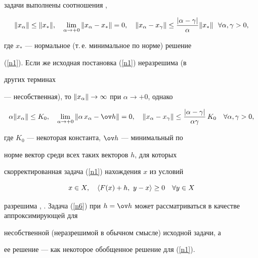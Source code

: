 задачи выполнены соотношения \cite{baku2}, \cite{baku3}


\begin{equation}\label{n4}


\|\xa\|\leq\| x_*\|,\quad


\lim_{\alpha\to+0}\|\xa- x_*\|=0,\quad


\|\xa-x_{\gamma}\|\leq \frac{|\alpha-\gamma|}{\alpha}


\| x_*\|\ \ \forall \alpha,\gamma>0,


\end{equation}


где $x_*$ --- нормальное (т.\,е. минимальное по норме) решение


(\ref{n1}). Если же исходная постановка (\ref{n1}) неразрешима (в


других терминах


--- несобственная), то $\|x_{\alpha}\|\to\infty$ при $\alpha\to+0$, однако


\begin{equation}\label{n5}


\alpha\|\xa\|\leq K_0,\quad


\lim_{\alpha\to+0} \|\alpha\,x_{\alpha}-\ov h\|=0,\quad


\|\xa-x_{\gamma}\|\leq \frac{|\alpha-\gamma|}{\alpha\gamma}


\,K_0\quad \forall \alpha,\gamma>0,


\end{equation}


где $K_0$ --- некоторая константа, $\ov h$ --- минимальный по


норме вектор среди всех таких векторов $h$, для которых


скорректированная задача (\ref{n1}) нахождения $x$ из условий


\begin{equation}\label{n6}


x\in X,\quad \lft F(x)+ h,\ y-x \rgt\geq0\quad


\forall y\in X


\end{equation}


разрешима \cite{kokur}, \cite{ppf3}. Задача (\ref{n6}) при $h=\ov


h$ может рассматриваться в качестве аппроксимирующей для


несобственной (неразрешимой в обычном смысле) исходной задачи, а


ее решение --- как некоторое обобщенное решение для (\ref{n1}).








